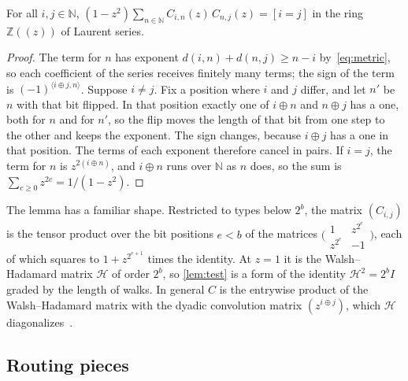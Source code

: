 \documentclass[11pt]{article}
\theoremstyle{definition}
\theoremstyle{definition}
\theoremstyle{remark}
\newcommand{\Z}{\mathbb{Z}}
\newcommand{\N}{\mathbb{N}}
\newcommand{\ip}[2]{\langle #1,#2\rangle}
\begin{document}
\begin{lemma}\label{lem:test}
For all $i,j\in\N$, $(1-z^2)\sum_{n\in\N}C_{i,n}(z)\,C_{n,j}(z)=[i=j]$ in the ring $\Z((z))$ of Laurent series.
\end{lemma}

\begin{proof}
The term for $n$ has exponent $d(i,n)+d(n,j)\ge n-i$ by~\eqref{eq:metric}, so each coefficient of the series receives finitely many terms; the sign of the term is $(-1)^{\ip{i\oplus j}n}$. Suppose $i\ne j$. Fix a position where $i$ and $j$ differ, and let $n'$ be $n$ with that bit flipped. In that position exactly one of $i\oplus n$ and $n\oplus j$ has a one, both for $n$ and for $n'$, so the flip moves the length of that bit from one step to the other and keeps the exponent. The sign changes, because $i\oplus j$ has a one in that position. The terms of each exponent therefore cancel in pairs. If $i=j$, the term for $n$ is $z^{2(i\oplus n)}$, and $i\oplus n$ runs over $\N$ as $n$ does, so the sum is $\sum_{c\ge0}z^{2c}=1/(1-z^2)$.
\end{proof}

The lemma has a familiar shape. Restricted to types below $2^b$, the matrix $(C_{i,j})$ is the tensor product over the bit positions $e<b$ of the matrices $\bigl(\begin{smallmatrix}1&z^{2^e}\\z^{2^e}&-1\end{smallmatrix}\bigr)$, each of which squares to $1+z^{2^{e+1}}$ times the identity. At $z=1$ it is the Walsh--Hadamard matrix $\mathcal H$ of order $2^b$, so \cref{lem:test} is a form of the identity $\mathcal H^2=2^bI$ graded by the length of walks. In general $C$ is the entrywise product of the Walsh--Hadamard matrix with the dyadic convolution matrix $(z^{i\oplus j})$, which $\mathcal H$ diagonalizes~\cite{SWS90}.

\subsection{Routing pieces}
\end{document}
